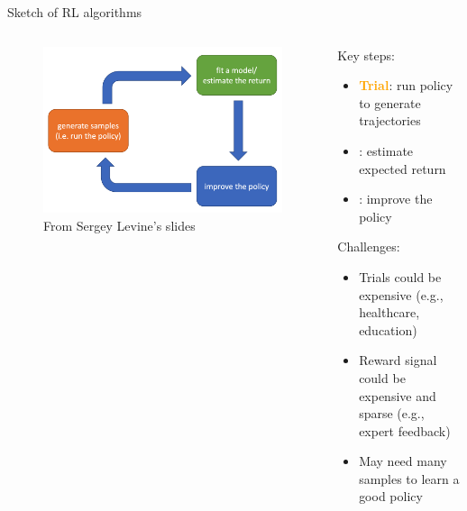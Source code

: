 \documentclass[usenames,dvipsnames,notes,11pt,aspectratio=169,hyperref={colorlinks=true, linkcolor=blue}]{beamer}
\begin{document}
\begin{frame}
    {Sketch of RL algorithms}
    \begin{columns}
        \begin{column}{0.4\textwidth}
            \begin{figure}
        \includegraphics[width=\textwidth]{figures/rl-basics}
                \caption{From Sergey Levine's slides}
            \end{figure}
        \end{column}
        \begin{column}{0.6\textwidth}
            Key steps:\\
            \begin{itemize}
                \item \textcolor{orange}{\bf Trial}: run policy to generate trajectories
                \item {}: estimate expected return
                \item {}: improve the policy  
            \end{itemize}

            \pause
            Challenges:\\
            \begin{itemize}
                \item Trials could be expensive (e.g., healthcare, education) 
                \item Reward signal could be expensive and sparse (e.g., expert feedback) 
                \item May need many samples to learn a good policy
            \end{itemize}
        \end{column}
    \end{columns}
\end{frame}
\end{document}
